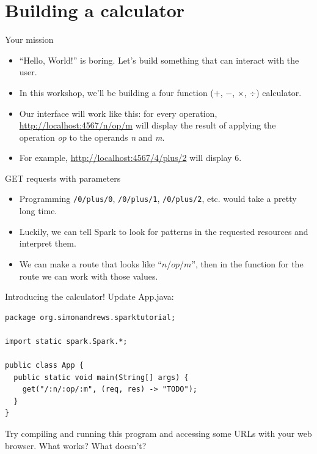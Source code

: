 \section{Building a calculator}

\begin{frame}{Your mission}
\begin{itemize}
    \item ``Hello, World!'' is boring. Let's build something that can interact with the user.
    \item In this workshop, we'll be building a four function ($+$, $-$, $\times$, $\div$) calculator.
    \item Our interface will work like this: for every operation, \url{http://localhost:4567/n/op/m} will display the result of applying the operation \textit{op} to the operands \textit{n} and \textit{m}.
    \item For example, \url{http://localhost:4567/4/plus/2} will display 6.
\end{itemize}
\end{frame}

\begin{frame}{GET requests with parameters}
\begin{itemize}
    \item Programming \texttt{/0/plus/0}, \texttt{/0/plus/1}, \texttt{/0/plus/2}, etc. would take a pretty long time.
    \item Luckily, we can tell Spark to look for patterns in the requested resources and interpret them.
    \item We can make a route that looks like ``$n$/$op$/$m$'', then in the function for the route we can work with those values.
\end{itemize}
\end{frame}

\begin{frame}[fragile]{Introducing the calculator!}
Update App.java:
\begin{verbatim}
package org.simonandrews.sparktutorial;

import static spark.Spark.*;

public class App {
  public static void main(String[] args) {
    get("/:n/:op/:m", (req, res) -> "TODO");
  }
}
\end{verbatim}
Try compiling and running this program and accessing some URLs with your web browser. What works? What doesn't?
\end{frame}

